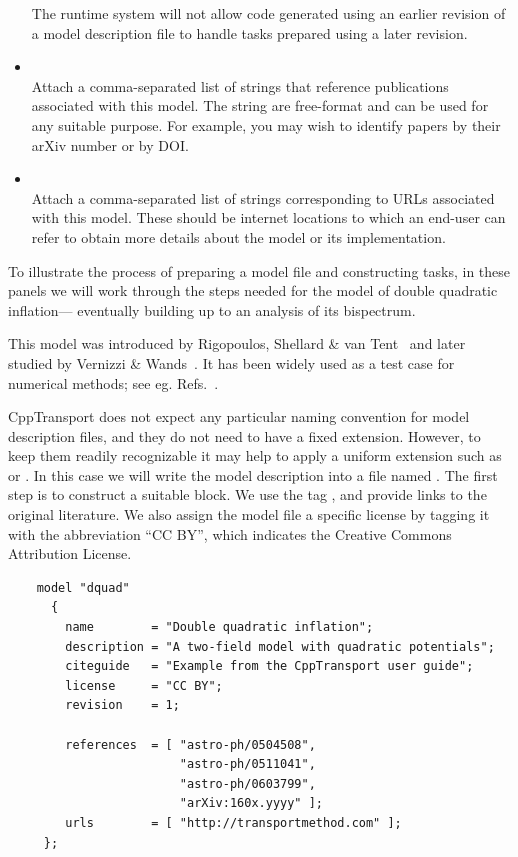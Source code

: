 \documentclass[11pt,a4paper]{article}
\renewcommand{\texttt}[1]{{\ttfamily\fontseries{l}\selectfont{#1}}}
\newenvironment{example}{\begin{tcolorbox}[enhanced,breakable,colback=black!10,colbacktitle=black!20,colframe=black!40,coltitle=black,title=Example,fonttitle=\sffamily\fontseries{b}\selectfont]}{\end{tcolorbox}}
\newcommand{\packagefont}{\sffamily}
\newcommand{\CppTransport}{{\packagefont CppTransport}}
\newcommand{\file}[1]{\texttt{{#1}}}
\newcommand{\block}[1]{\texttt{#1}}
\newcommand{\attribute}[1]{\texttt{#1}}
\begin{document}
\begin{itemize}
    The runtime system will not allow code generated using
    an earlier revision of a model description file to
    handle tasks prepared using a later revision.
    
    \item \attribute{references = [ string, string, ... ];} \\
    Attach a comma-separated list of strings
    that reference publications associated with this model.
    The string are free-format and can be used for any suitable
    purpose. For example, you may wish to identify papers by their
    arXiv number or by DOI.
    
    \item \attribute{urls = [ string, string, ... ];} \\
    Attach a comma-separated list of strings
    corresponding to URLs associated with this model.
    These should be internet locations to which an end-user
    can refer to obtain more details about the model or
    its implementation.
\end{itemize}

\begin{example}
    To illustrate the process of preparing a model file and
    constructing tasks,
    in these panels we will work through the steps needed
    for the model of double quadratic inflation---%
    eventually building up to an analysis of its
    bispectrum.

    This model was introduced by Rigopoulos, Shellard \& van
    Tent~\cite{Rigopoulos:2005xx,Rigopoulos:2005us}
    and later studied by
    Vernizzi \& Wands~\cite{Vernizzi:2006ve}.
    It has been widely used as a test case for numerical methods;
    see eg. Refs.~\cite{Mulryne:2009kh,Mulryne:2010rp}.
    
    {\CppTransport} does not expect any particular naming convention
    for model description files, and they do not need to have a fixed
    extension.
    However, to keep them readily recognizable it may help to
    apply a uniform extension such as \file{.model} or
    \file{.mdl}.
    In this case we will write the model description into a file
    named \file{dquad.model}.
    The first step is to construct a suitable \block{model} block.
	We use the tag \attribute{"dquad"},
	and provide links to the original literature.
	We also assign the model file
	a specific license by tagging it with the abbreviation
	``CC BY'', which indicates the Creative Commons
	Attribution License.
    
    \begin{verbatim}
    model "dquad"
      {
        name        = "Double quadratic inflation";
        description = "A two-field model with quadratic potentials";
        citeguide   = "Example from the CppTransport user guide";
        license     = "CC BY";
        revision    = 1;
    
        references  = [ "astro-ph/0504508",
                        "astro-ph/0511041",
                        "astro-ph/0603799",
                        "arXiv:160x.yyyy" ];
        urls        = [ "http://transportmethod.com" ];
     };    
    \end{verbatim}
\end{example}    
\end{document}
